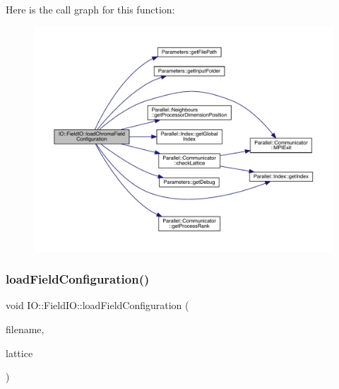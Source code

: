 Here is the call graph for this function\+:\nopagebreak
\begin{figure}[H]
\begin{center}
\leavevmode
\includegraphics[width=350pt]{class_i_o_1_1_field_i_o_a8d6ea988658b107eca71c858d3816c99_cgraph}
\end{center}
\end{figure}
\mbox{\label{class_i_o_1_1_field_i_o_afdd7f357ed71f7ff3ab1b5be987a51b5}} 
\subsubsection{\texorpdfstring{loadFieldConfiguration()}{loadFieldConfiguration()}}
{\footnotesize\ttfamily void I\+O\+::\+Field\+I\+O\+::load\+Field\+Configuration (\begin{DoxyParamCaption}\item[{std\+::string}]{filename,  }\item[{\mbox{\hyperlink{class_lattice}{Lattice}}$<$ \mbox{\hyperlink{class_s_u3}{S\+U3}} $>$ $\ast$}]{lattice }\end{DoxyParamCaption})\hspace{0.3cm}{\ttfamily [static]}}

